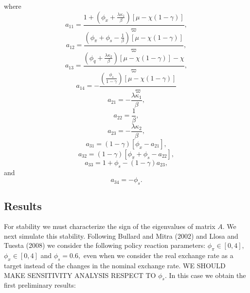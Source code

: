 \documentclass{article}
\begin{document}
where%
\begin{equation*}
a_{11}=\frac{1+\left( \phi _{x}+\frac{\lambda \kappa _{1}}{\beta }\right) %
\left[ \mu -\chi \left( 1-\gamma \right) \right] }{\varpi },
\end{equation*}%
\begin{equation*}
a_{12}=\frac{\left( \phi _{\pi }+\phi _{s}-\frac{1}{\beta }\right) \left[
\mu -\chi \left( 1-\gamma \right) \right] }{\varpi },
\end{equation*}%
\begin{equation*}
a_{13}=\frac{\left( \phi _{q}+\frac{\lambda \kappa _{2}}{\beta }\right) %
\left[ \mu -\chi \left( 1-\gamma \right) \right] -\chi }{\varpi },
\end{equation*}%
\begin{equation*}
a_{14}=-\frac{\left( \frac{\phi _{s}}{1-\gamma }\right) \left[ \mu -\chi
\left( 1-\gamma \right) \right] }{\varpi }
\end{equation*}%
\begin{equation*}
a_{21}=-\frac{\lambda \kappa _{1}}{\beta },
\end{equation*}%
\begin{equation*}
a_{22}=\frac{1}{\beta },
\end{equation*}%
\begin{equation*}
a_{23}=-\frac{\lambda \kappa _{2}}{\beta },
\end{equation*}%
\begin{equation*}
a_{31}=\left( 1-\gamma \right) \left[ \phi _{x}-a_{21}\right] ,
\end{equation*}%
\begin{equation*}
a_{32}=\left( 1-\gamma \right) \left[ \phi _{\pi }+\phi _{s}-a_{22}\right] ,
\end{equation*}%
\begin{equation*}
a_{33}=1+\phi _{s}-\left( 1-\gamma \right) a_{23},
\end{equation*}%
and%
\begin{equation*}
a_{34}=-\phi _{s}.
\end{equation*}

\subsection{Results}

For stability we must characterize the sign of the eigenvalues of matrix $A.$
We next simulate this stability. Following Bullard and Mitra (2002) and
Llosa and Tuesta (2008) we consider the following policy reaction
parameters: $\phi _{\pi }\in \left[ 0,4\right] ,$ $\phi _{x}\in \left[ 0,4%
\right] $ and $\phi _{s}=0.6,$ even when we consider the real exchange rate
as a target instead of the changes in the nominal exchange rate. WE SHOULD
MAKE SENSITIVITY ANALYSIS RESPECT TO $\phi _{s}.$ In this case we obtain the
first preliminary results:
\end{document}
